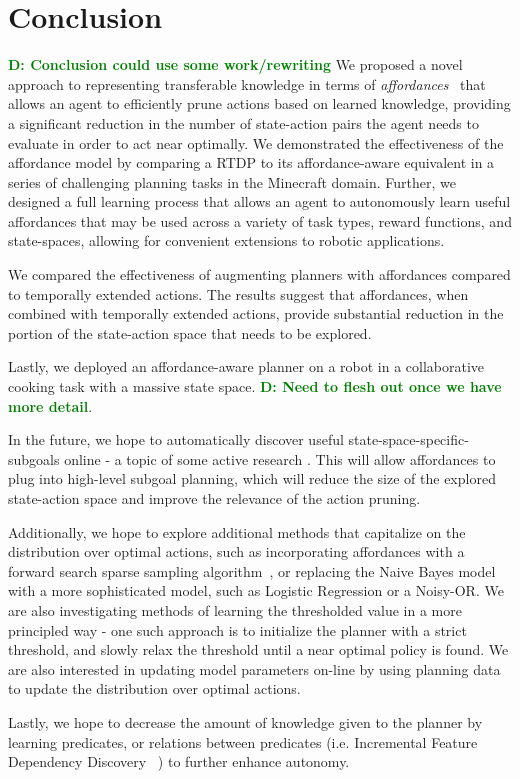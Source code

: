 \documentclass[conference]{IEEEtran}
\newcommand{\dnote}[1]{\textcolor{Green}{\textbf{D: #1}}}
\begin{document}
\section{Conclusion}
\label{sec:conclusion}
\dnote{Conclusion could use some work/rewriting}
We proposed a novel approach to representing transferable knowledge in terms of
{\em affordances}~\cite{gibson77} that allows an agent to efficiently prune actions 
based on learned knowledge, providing a significant reduction in the number of state-action
pairs the agent needs to evaluate in order to act near optimally. We demonstrated the 
effectiveness of the affordance model by comparing a RTDP to its affordance-aware
equivalent in a series of challenging planning tasks in the Minecraft domain. Further, we designed
a full learning process that allows an agent to autonomously learn useful affordances that may be used
across a variety of task types, reward functions, and state-spaces, allowing for convenient extensions 
to robotic applications.

We compared the effectiveness of augmenting planners with affordances compared to 
temporally extended actions. The results suggest that affordances, when combined with 
temporally extended actions, provide substantial reduction in the portion of the state-action 
space that needs to be explored.

Lastly, we deployed an affordance-aware planner on a robot in a collaborative cooking task with a massive 
state space. \dnote{Need to flesh out once we have more detail}.

In the future, we hope to automatically discover useful state-space-specific-subgoals online 
- a topic of some active research \cite{Mcgovern01automaticdiscovery,Simsek:2005:IUS:1102351.1102454}.
This will allow affordances to plug into high-level subgoal planning, which will reduce the size of the 
explored state-action space and improve the relevance of the action pruning. 

Additionally, we hope to explore additional methods that capitalize on the distribution over optimal actions, such as incorporating affordances with a forward search sparse sampling algorithm~\cite{walsh2010integrating}, or replacing the Naive Bayes model with a more sophisticated model, such as Logistic Regression or a Noisy-OR. We are also investigating methods of learning the thresholded value in a more principled way - one such approach is to initialize the planner with a strict threshold, and slowly relax the threshold until a near optimal policy is found. We are also interested in updating model parameters on-line by using planning data to update the distribution over optimal actions. 

Lastly, we hope to decrease the amount of knowledge given to the planner by learning predicates, or relations between predicates (i.e. Incremental Feature Dependency Discovery ~\cite{ICML2011Geramifard_473}) to further enhance autonomy.

{\small


}
\end{document}
